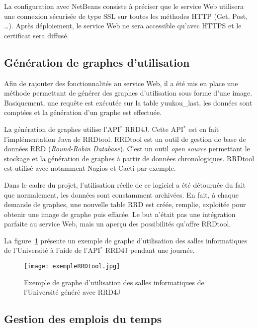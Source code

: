 La configuration avec NetBeans consiste \`a pr\'eciser que le service Web utilisera une connexion s\'ecuris\'ee de type SSL sur toutes les m\'ethodes HTTP (Get, Post, \ldots).
Apr\`es d\'eploiement, le service Web ne sera accessible qu'avec HTTPS et le certificat sera diffus\'e.


\subsection{G\'en\'eration de graphes d'utilisation}

Afin de rajouter des fonctionnalit\'es au service Web, il a \'et\'e mis en place une m\'ethode permettant de g\'en\'erer des graphes d'utilisation sous forme d'une image.
Basiquement, une requ\^ete est ex\'ecut\'ee sur la table \textsf{yuukou\_last}, les donn\'ees sont compt\'ees et la g\'en\'eration d'un graphe est effectu\'ee.

La g\'en\'eration de graphes utilise l'API$^*$ RRD4J.
Cette API$^*$ est en fait l'impl\'ementation Java de RRDtool.
RRDtool est un outil de gestion de base de donn\'ees RRD (\textit{Round-Robin Database}).
C'est un outil \textit{open source} permettant le stockage et la g\'en\'eration de graphes \`a partir de donn\'ees chronologiques.
RRDtool est utilis\'e avec notamment Nagios et Cacti par exemple.

Dans le cadre du projet, l'utilisation r\'eelle de ce logiciel a \'et\'e d\'etourn\'ee du fait que normalement, les donn\'ees sont constamment archiv\'ees.
En fait, \`a chaque demande de graphes, une nouvelle table RRD est cr\'e\'ee, remplie, exploit\'ee pour obtenir une image de graphe puis effac\'ee.
Le but n'\'etait pas une int\'egration parfaite au service Web, mais un aper\c{c}u des possibilit\'es qu'offre RRDtool.

La figure~\ref{figure:rrdTool} pr\'esente un exemple de graphe d'utilisation des salles informatiques de l'Universit\'e \`a l'aide de l'API$^*$ RRD4J pendant une journ\'ee.

\clearpage

\begin{figure}[!ht]
	\centering
	\texttt{[image: exempleRRDtool.jpg]}
	\caption{Exemple de graphe d'utilisation des salles informatiques de l'Universit\'e g\'en\'er\'e avec RRD4J}
	\label{figure:rrdTool}

\end{figure}

\subsection{Gestion des emplois du temps}
\label{section:emploiDuTemps}

